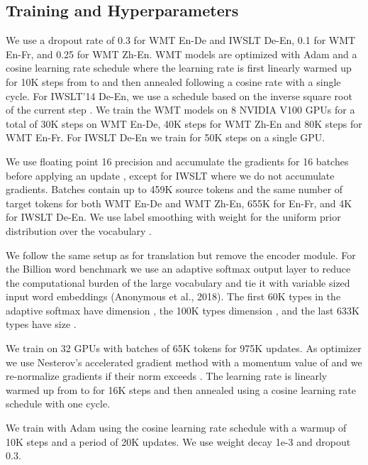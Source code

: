 \documentclass{article} \usepackage{iclr2019_conference,times}
\def\gbw{Billion word}
\begin{document}
\subsection{Training and Hyperparameters}


We use a dropout rate of 0.3 for WMT En-De and IWSLT De-En, 0.1 for WMT En-Fr, and 0.25 for WMT Zh-En. 
WMT models are optimized with Adam and a cosine learning rate schedule \citep{kingma2015adam,loshchilov2016cosine} where the learning rate is first linearly warmed up for 10K steps from  to  and then annealed following a cosine rate with a single cycle. 
For IWSLT'14 De-En, we use a schedule based on the inverse square root of the current step \citep{vaswani2017transformer}.
We train the WMT models on 8 NVIDIA V100 GPUs for a total of 30K steps on WMT En-De, 40K steps for WMT Zh-En and 80K steps for WMT En-Fr. 
For IWSLT De-En we train for 50K steps on a single GPU.

We use floating point 16 precision and accumulate the gradients for 16 batches before applying an update \citep{ott2018scaling}, except for IWSLT where we do not accumulate gradients.
Batches contain up to 459K source tokens and the same number of target tokens for both WMT En-De and WMT Zh-En, 655K for En-Fr, and 4K for IWSLT De-En.
We use label smoothing with  weight for the uniform prior distribution over the vocabulary  \citep{szegedy2015inception,pereyra2017regularize}.

We follow the same setup as for translation but remove the encoder module.
For the \gbw{} benchmark we use an adaptive softmax output layer to reduce the computational burden of the large vocabulary \citep{grave2016arxiv,press2017using} and tie it with variable sized input word embeddings (Anonymous et al., 2018). 
The first 60K types in the adaptive softmax have dimension , the 100K types dimension , and the last 633K types have size .

We train on 32 GPUs with batches of 65K tokens for 975K updates. As optimizer we use Nesterov's accelerated gradient method \citep{sutskever2013icml} with a momentum value of  and we re-normalize gradients if their norm exceeds  \citep{pascanu2013difficulty}.
The learning rate is linearly warmed up from  to  for 16K steps and then annealed using a cosine learning rate schedule \citep{loshchilov2016cosine} with one cycle.

We train with Adam using the cosine learning rate schedule with a warmup of 10K steps and a period of 20K updates. 
We use weight decay 1e-3 and dropout 0.3.  
\end{document}
